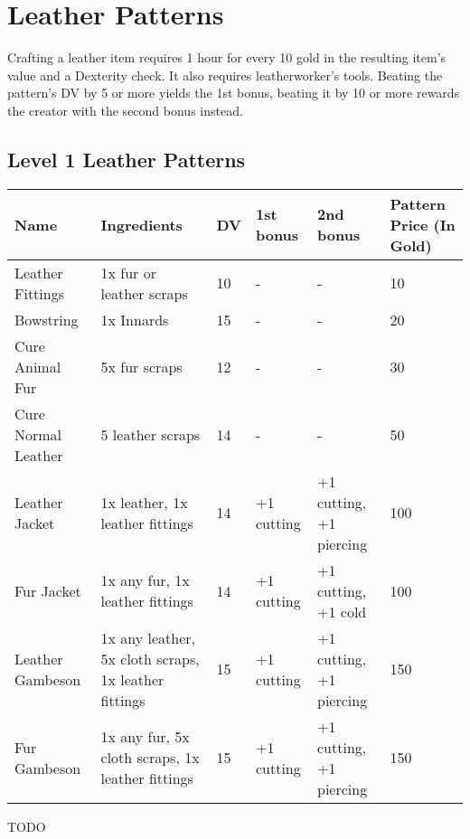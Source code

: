 \section{Leather Patterns}\label{sec:leatherPatterns}
Crafting a leather item requires 1 hour for every 10 gold in the resulting item's value and a Dexterity check.
It also requires leatherworker's tools.
Beating the pattern's DV by 5 or more yields the 1st bonus, beating it by 10 or more rewards the creator with the second bonus instead.\\

\subsection{Level 1 Leather Patterns}
\begin{longtable}{p{1.5cm} | p{2.5cm} | l | p{2cm} | p{2cm} | p{1cm} }
	Name & Ingredients & DV  & 1st bonus & 2nd bonus & Pattern Price (In Gold)\\ \hline
	Leather Fittings & 1x fur or leather scraps & 10 & - & - & 10\\
	Bowstring & 1x Innards & 15 & - & - & 20\\
	Cure Animal Fur & 5x fur scraps & 12 & - & - & 30\\
	Cure Normal Leather & 5 leather scraps & 14 & - & - & 50\\
	Leather Jacket & 1x leather, 1x leather fittings & 14 & +1 cutting & +1 cutting, +1 piercing & 100\\
	Fur Jacket & 1x any fur, 1x leather fittings & 14 & +1 cutting & +1 cutting, +1 cold & 100\\
	Leather Gambeson & 1x any leather, 5x cloth scraps, 1x leather fittings & 15 & +1 cutting & +1 cutting, +1 piercing & 150\\
	Fur Gambeson & 1x any fur, 5x cloth scraps, 1x leather fittings & 15 & +1 cutting & +1 cutting, +1 piercing & 150\\
\end{longtable}

TODO

